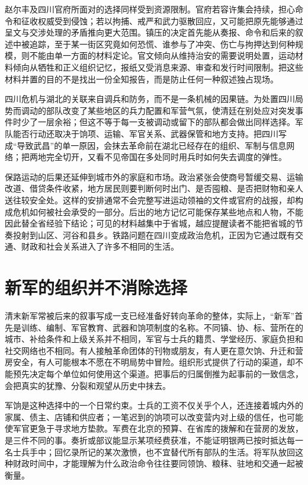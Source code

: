 赵尔丰及四川官府所面对的选择同样受到资源限制。官府若容许集会持续，担心命令和征收权威受到侵蚀；若以拘捕、戒严和武力驱散回应，又可能把原先能够通过呈文与交涉处理的矛盾推向更大范围。镇压的决定首先能从奏报、命令和后来的叙述中被追踪，至于某一街区究竟如何恐慌、谁参与了冲突、伤亡与拘押达到何种规模，则不能由单一方面的材料定论。官文倾向从维持治安的需要说明处置，运动材料倾向从牺牲和正义组织记忆，报纸又受消息来源、审查和发行时间限制。把这些材料并置的目的不是找出一份全知报告，而是防止任何一种叙述独占现场。

四川危机与湖北的关联来自调兵和防务，而不是一条机械的因果链。为处置四川局势而调动的部队改变了某些地区的兵力配置和军营气氛，使清廷在别处应对突发事件时少了一层余裕；但这不等于每一支被调动或留下的部队都会做出同样选择。军队能否行动还取决于饷项、运输、军官关系、武器保管和地方支持。把四川写成“导致武昌”的单一原因，会抹去革命前在湖北已经存在的组织、军制与信息网络；把两地完全切开，又看不见帝国在多处同时用兵时如何失去调度的弹性。

保路运动的后果还延伸到城市外的家庭和市场。政治紧张会使商号暂缓交易、运输改道、借贷条件收紧，地方居民则要判断何时出门、是否囤粮、是否把财物和亲人送往较安全处。这样的安排通常不会完整写进运动领袖的文件或官府的战报，却构成危机如何被社会承受的一部分。后出的地方记忆可能保存某些地点和人物，不能因此替全省经验下结论；可见的材料越集中于省城，越应提醒读者不能把省城的节奏投射到山区、河谷和县乡。铁路问题在四川变成政治危机，正因为它通过既有交通、财政和社会关系进入了许多不相同的生活。

\section{新军的组织并不消除选择}

清末新军常被后来的叙事写成一支已经准备好转向革命的整体，实际上，“新军”首先是训练、编制、军官教育、武器和饷项制度的名称。不同镇、协、标、营所在的城市、补给条件和上级关系并不相同，军官与士兵的籍贯、学堂经历、家庭负担和社交网络也不相同。有人接触革命团体的刊物或朋友，有人更在意欠饷、升迁和营房安全，有人可能根本不愿在不明局势中冒险。组织形式提供了行动的渠道，却不能预先决定每个单位如何使用这个渠道。把事后的归属倒推为起事前的一致信念，会把真实的犹豫、分裂和观望从历史中抹去。

军饷是这种选择中的一个日常约束。士兵的工资不仅关乎个人，还连接着城内外的家属、债主、店铺和供应者；一笔迟到的饷项可以改变营内对上级的信任，也可能使军官更急于寻求地方垫款。军费在北京的预算、在省库的拨解和在营房的发放，是三件不同的事。奏折或部议能显示某项经费获准，不能证明银两已按时抵达每一名士兵手中；回忆录所记的某次激愤，也不宜替代所有部队的生活。将军队放回这种财政时间中，才能理解为什么政治命令往往要同领饷、粮秣、驻地和交通一起被衡量。

